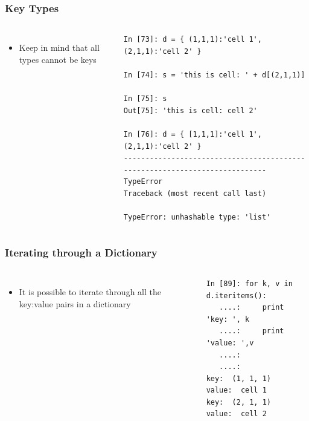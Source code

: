 \documentclass{beamer}
\begin{document}
\begin{frame}[fragile]
\frametitle{Key Types}
\begin{columns}[c]
\column{2.5in}
\begin{itemize}
\item{Keep in mind that all types cannot be keys}
\end{itemize}

\column{2.5in}
\begin{lstlisting}
In [73]: d = { (1,1,1):'cell 1', (2,1,1):'cell 2' }

In [74]: s = 'this is cell: ' + d[(2,1,1)]

In [75]: s
Out[75]: 'this is cell: cell 2'

In [76]: d = { [1,1,1]:'cell 1', (2,1,1):'cell 2' }
---------------------------------------------------------------------------
TypeError                                 Traceback (most recent call last)

TypeError: unhashable type: 'list'

\end{lstlisting}
\end{columns}
\end{frame}


\begin{frame}[fragile]
\frametitle{Iterating through a Dictionary}
\begin{columns}[c]
\column{2.5in}
\begin{itemize}
\item{It is possible to iterate through all the key:value pairs in a dictionary}
\end{itemize}

\column{2.5in}
\begin{lstlisting}
In [89]: for k, v in d.iteritems():
   ....:     print 'key: ', k
   ....:     print 'value: ',v
   ....:
   ....:
key:  (1, 1, 1)
value:  cell 1
key:  (2, 1, 1)
value:  cell 2
\end{lstlisting}
\end{columns}
\end{frame}
\end{document}
